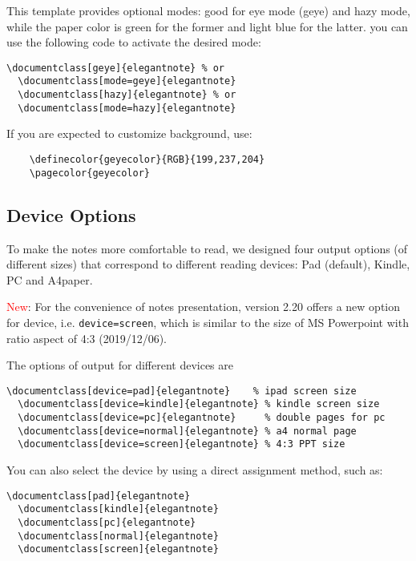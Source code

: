 \documentclass[en,hazy,blue,screen,14pt]{elegantnote}
\begin{document}
This template provides optional modes: good for eye mode (geye) and hazy mode, while the paper color is green for the former and light blue for the latter. you can use the following code to activate the desired mode:
\begin{lstlisting}[frame=none]  
  \documentclass[geye]{elegantnote} % or
  \documentclass[mode=geye]{elegantnote}
  \documentclass[hazy]{elegantnote} % or
  \documentclass[mode=hazy]{elegantnote}
\end{lstlisting}

\begin{remark}
  If you are expected to customize background, use:
  \begin{lstlisting}
    \definecolor{geyecolor}{RGB}{199,237,204}
    \pagecolor{geyecolor}
  \end{lstlisting}
\end{remark}


\subsection{Device Options}

To make the notes more comfortable to read, we designed four output options (of different sizes) that correspond to different reading devices: Pad (default), Kindle, PC and A4paper. 

\textcolor{red}{New}: For the convenience of notes presentation, version 2.20 offers a new option for device, i.e. \lstinline{device=screen}, which is similar to the size of MS Powerpoint with ratio aspect of 4:3 (2019/12/06).

The options of output for different devices are
\begin{lstlisting}[frame=none]  
  \documentclass[device=pad]{elegantnote}    % ipad screen size
  \documentclass[device=kindle]{elegantnote} % kindle screen size
  \documentclass[device=pc]{elegantnote}     % double pages for pc 
  \documentclass[device=normal]{elegantnote} % a4 normal page
  \documentclass[device=screen]{elegantnote} % 4:3 PPT size
\end{lstlisting}

\begin{note}
You can also select the device by using a direct assignment method, such as:
\end{note}

\begin{lstlisting}[frame=none]  
  \documentclass[pad]{elegantnote}
  \documentclass[kindle]{elegantnote}
  \documentclass[pc]{elegantnote}
  \documentclass[normal]{elegantnote}
  \documentclass[screen]{elegantnote}
\end{lstlisting}
\end{document}
